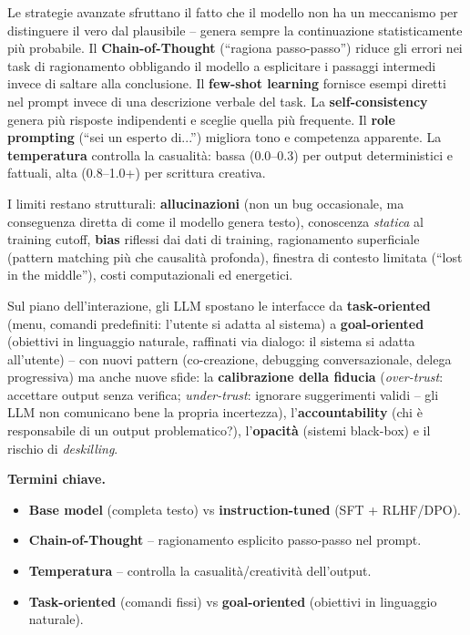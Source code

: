 \documentclass[11pt,a4paper]{article}
\newcommand{\termini}{\medskip\noindent\textbf{\textcolor{blue!45!black}{Termini chiave.}}}
\begin{document}
Le strategie avanzate sfruttano il fatto che il modello non ha un meccanismo per distinguere il vero dal plausibile -- genera sempre la continuazione statisticamente pi\`u probabile. Il \textbf{Chain-of-Thought} (``ragiona passo-passo'') riduce gli errori nei task di ragionamento obbligando il modello a esplicitare i passaggi intermedi invece di saltare alla conclusione. Il \textbf{few-shot learning} fornisce esempi diretti nel prompt invece di una descrizione verbale del task. La \textbf{self-consistency} genera pi\`u risposte indipendenti e sceglie quella pi\`u frequente. Il \textbf{role prompting} (``sei un esperto di...'') migliora tono e competenza apparente. La \textbf{temperatura} controlla la casualit\`a: bassa (0.0--0.3) per output deterministici e fattuali, alta (0.8--1.0+) per scrittura creativa.

I limiti restano strutturali: \textbf{allucinazioni} (non un bug occasionale, ma conseguenza diretta di come il modello genera testo), conoscenza \emph{statica} al training cutoff, \textbf{bias} riflessi dai dati di training, ragionamento superficiale (pattern matching pi\`u che causalit\`a profonda), finestra di contesto limitata (``lost in the middle''), costi computazionali ed energetici.

Sul piano dell'interazione, gli LLM spostano le interfacce da \textbf{task-oriented} (menu, comandi predefiniti: l'utente si adatta al sistema) a \textbf{goal-oriented} (obiettivi in linguaggio naturale, raffinati via dialogo: il sistema si adatta all'utente) -- con nuovi pattern (co-creazione, debugging conversazionale, delega progressiva) ma anche nuove sfide: la \textbf{calibrazione della fiducia} (\emph{over-trust}: accettare output senza verifica; \emph{under-trust}: ignorare suggerimenti validi -- gli LLM non comunicano bene la propria incertezza), l'\textbf{accountability} (chi \`e responsabile di un output problematico?), l'\textbf{opacit\`a} (sistemi black-box) e il rischio di \emph{deskilling}.

\termini
\begin{itemize}
\item \textbf{Base model} (completa testo) vs \textbf{instruction-tuned} (SFT + RLHF/DPO).
\item \textbf{Chain-of-Thought} -- ragionamento esplicito passo-passo nel prompt.
\item \textbf{Temperatura} -- controlla la casualit\`a/creativit\`a dell'output.
\item \textbf{Task-oriented} (comandi fissi) vs \textbf{goal-oriented} (obiettivi in linguaggio naturale).
\end{itemize}
\end{document}
